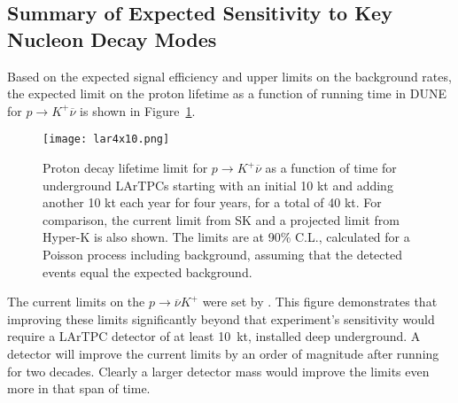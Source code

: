 \subsection{\boldmath Summary of Expected Sensitivity to Key Nucleon Decay Modes}

Based on the expected signal efficiency and upper limits on the
background rates, the expected limit on the proton
lifetime as a function of running time in DUNE for $p \rightarrow K^+
\overline{\nu}$ is shown in Figure~\ref{fig:kdklimit}. 
\begin{figure}[!htb]
\centering
\texttt{[image: lar4x10.png]}
\caption[Proton decay lifetime limit for $p \rightarrow K^+ \overline{\nu}$
  versus time]{Proton decay lifetime limit for $p
  \rightarrow K^+ \overline{\nu}$ as a function of time for
  underground LArTPCs starting with an initial 10 kt and adding another 10 kt
each year for four years, for a total of 40 kt. 
  For comparison, the current limit from SK and a projected limit from Hyper-K 
is also shown.
  The limits are at 90\% C.L., calculated for
  a Poisson process including background, assuming that the detected events
  equal the expected background.}
\label{fig:kdklimit}
\end{figure}
%



The current limits on
the $p \rightarrow \overline{\nu} K^+$ were set by \superk. This figure demonstrates that 
improving these limits significantly
beyond that experiment's sensitivity would require 
a LArTPC
detector of at least \SI{10}{kt}, installed deep underground. %
A  detector will improve the current limits by an order of
magnitude after running for two decades.  Clearly a larger detector
mass would improve the limits even more in that span of time.


